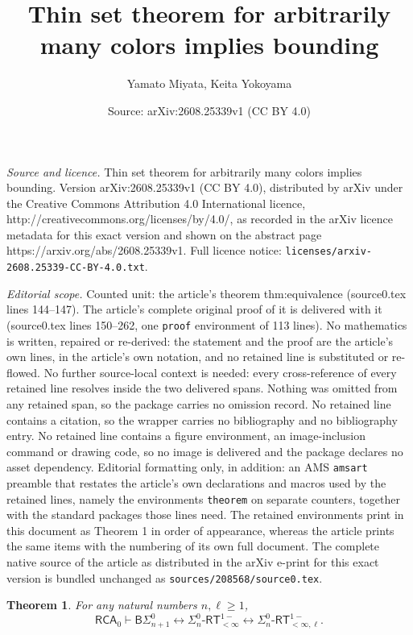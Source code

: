 \documentclass[10pt,a4paper]{amsart}
\title{Thin set theorem for arbitrarily many colors implies bounding}
\author{Yamato Miyata, Keita Yokoyama}
\date{Source: arXiv:2608.25339v1 (CC BY 4.0)}
\newtheorem{theorem}{Theorem}
\begin{document}
\maketitle

\noindent\emph{Source and licence.} Thin set theorem for arbitrarily many colors implies bounding. Version arXiv:2608.25339v1 (CC BY 4.0), distributed by arXiv under the Creative Commons Attribution 4.0 International licence, http://creativecommons.org/licenses/by/4.0/, as recorded in the arXiv licence metadata for this exact version and shown on the abstract page https://arxiv.org/abs/2608.25339v1. Full licence notice: \texttt{licenses/arxiv-2608.25339-CC-BY-4.0.txt}.\par\smallskip

\noindent\textit{Editorial scope.} Counted unit: the article's theorem thm:equivalence (source0.tex lines 144--147). The article's complete original proof of it is delivered with it (source0.tex lines 150--262, one \texttt{proof} environment of 113 lines). No mathematics is written, repaired or re-derived: the statement and the proof are the article's own lines, in the article's own notation, and no retained line is substituted or re-flowed.  No further source-local context is needed: every cross-reference of every retained line resolves inside the two delivered spans.  Nothing was omitted from any retained span, so the package carries no omission record.  No retained line contains a citation, so the wrapper carries no bibliography and no bibliography entry.  No retained line contains a figure environment, an image-inclusion command or drawing code, so no image is delivered and the package declares no asset dependency.  Editorial formatting only, in addition: an AMS \texttt{amsart} preamble that restates the article's own declarations and macros used by the retained lines, namely the environments \texttt{theorem} on separate counters, together with the standard packages those lines need.  The retained environments print in this document as Theorem 1 in order of appearance, whereas the article prints the same items with the numbering of its own full document.  The complete native source of the article as distributed in the arXiv e-print for this exact version is bundled unchanged as \texttt{sources/208568/source0.tex}.
\begin{theorem}\label{thm:equivalence}
For any natural numbers $n,\ell \ge 1$,
\[\mathsf{RCA}_0\vdash\mathsf{B}\Sigma_{n+1}^{0}\leftrightarrow \Sigma_{n}^{0}\text{-}\mathsf{RT}_{<\infty}^{1-}\leftrightarrow\Sigma_{n}^{0}\text{-}\mathsf{RT}_{<\infty,\ell}^{1-}.\]
\end{theorem}
\end{document}
